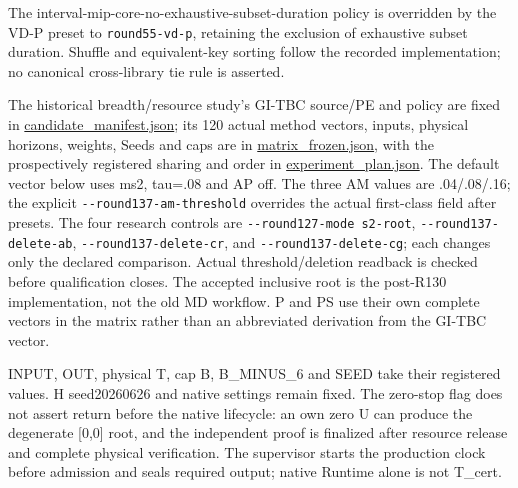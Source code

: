 \documentclass[
  american,
  11pt,
]{article}
\begin{document}
The interval-mip-core-no-exhaustive-subset-duration policy is overridden
by the VD-P preset to \texttt{round55-\allowbreak{}vd-\allowbreak{}p}, retaining
the exclusion of exhaustive subset duration. Shuffle and equivalent-key
sorting follow the recorded implementation; no canonical cross-library
tie rule is asserted.

The historical breadth/resource study's GI-TBC source/PE and policy are
fixed in
\href{https://github.com/yifanXovo/TailoredExact/blob/codex/round172-journal-manuscript/results/unified_exact_round137/candidate_manifest.json}{candidate\_\allowbreak{}manifest.json};
its 120 actual method vectors, inputs, physical horizons, weights, Seeds
and caps are in
\href{https://github.com/yifanXovo/TailoredExact/blob/codex/round172-journal-manuscript/results/unified_exact_round137/matrix_frozen.json}{matrix\_\allowbreak{}frozen.json},
with the prospectively registered sharing and order in
\href{https://github.com/yifanXovo/TailoredExact/blob/codex/round172-journal-manuscript/results/unified_exact_round137/experiment_plan.json}{experiment\_\allowbreak{}plan.json}.
The default vector below uses ms2, tau=.08 and AP off. The three AM
values are .04/.08/.16; the explicit
\texttt{-\allowbreak{}-\allowbreak{}round137-\allowbreak{}am-\allowbreak{}threshold} overrides the actual
first-class field after presets. The four research controls are
\texttt{-\allowbreak{}-\allowbreak{}round127-\allowbreak{}mode s2-\allowbreak{}root},
\texttt{-\allowbreak{}-\allowbreak{}round137-\allowbreak{}delete-\allowbreak{}ab},
\texttt{-\allowbreak{}-\allowbreak{}round137-\allowbreak{}delete-\allowbreak{}cr}, and
\texttt{-\allowbreak{}-\allowbreak{}round137-\allowbreak{}delete-\allowbreak{}cg}; each changes only the
declared comparison. Actual threshold/deletion readback is checked
before qualification closes. The accepted inclusive root is the
post-R130 implementation, not the old MD workflow. P and PS use their
own complete vectors in the matrix rather than an abbreviated derivation
from the GI-TBC vector.

INPUT, OUT, physical T, cap B, B\_\allowbreak{}MINUS\_\allowbreak{}6 and SEED take their
registered values. H seed20260626 and native settings remain fixed. The
zero-stop flag does not assert return before the native lifecycle: an
own zero U can produce the degenerate {[}0,0{]} root, and the
independent proof is finalized after resource release and complete
physical verification. The supervisor starts the production clock before
admission and seals required output; native Runtime alone is not
T\_\allowbreak{}cert.
\end{document}
